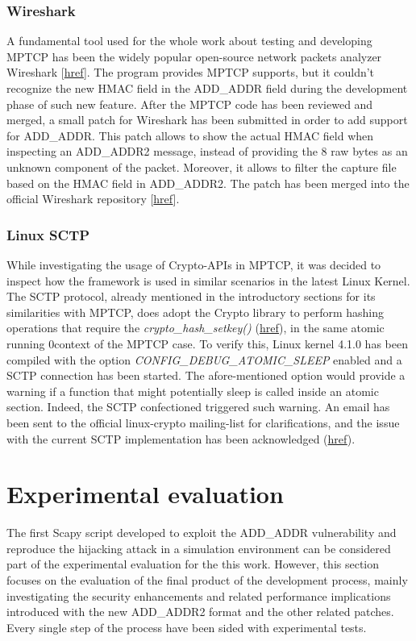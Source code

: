 \subsubsection{Wireshark}
A fundamental tool used for the whole work about testing and developing MPTCP has been the widely popular open-source network packets analyzer Wireshark [\href{https://www.wireshark.org/}{href}]. The program provides MPTCP supports, but it couldn't recognize the new HMAC field in the ADD\_ADDR field during the development phase of such new feature. After the MPTCP code has been reviewed and merged, a small patch for Wireshark has been submitted in order to add support for ADD\_ADDR. This patch allows to show the actual HMAC field when inspecting an ADD\_ADDR2 message, instead of providing the 8 raw bytes as an unknown component of the packet. Moreover, it allows to filter the capture file based on the HMAC field in ADD\_ADDR2. The patch has been merged into the official Wireshark repository [\href{https://github.com/wireshark/wireshark/commit/98fd9b852446ada31d47c158e022c545d0bc7f42}{href}].

\subsubsection{Linux SCTP}
While investigating the usage of Crypto-APIs in MPTCP, it was decided to inspect how the framework is used in similar scenarios in the latest Linux Kernel. The SCTP protocol, already mentioned in the introductory sections for its similarities with MPTCP, does adopt the Crypto library to perform hashing operations that require the \textit{crypto\_hash\_setkey()} (\href{http://lxr.free-electrons.com/source/net/sctp/auth.c#L751}{href}), in the same atomic running 0context of the MPTCP case. To verify this, Linux kernel 4.1.0 has been compiled with the option \textit{CONFIG\_DEBUG\_ATOMIC\_SLEEP} enabled and a SCTP connection has been started. The afore-mentioned option would provide a warning if a function that might potentially sleep is called inside an atomic section. Indeed, the SCTP confectioned triggered such warning. An email has been sent to the official linux-crypto mailing-list for clarifications, and the issue with the current SCTP implementation has been acknowledged (\href{http://comments.gmane.org/gmane.linux.kernel.cryptoapi/17937}{href}).

\section{Experimental evaluation}
\label{exp}
The first Scapy script developed to exploit the ADD\_ADDR vulnerability and reproduce the hijacking attack in a simulation environment can be considered part of the experimental evaluation for the this work. However, this section focuses on the evaluation of the final product of the development process, mainly investigating the security enhancements and related performance implications introduced with the new ADD\_ADDR2 format and the other related patches.
Every single step of the process have been sided with experimental tests.

